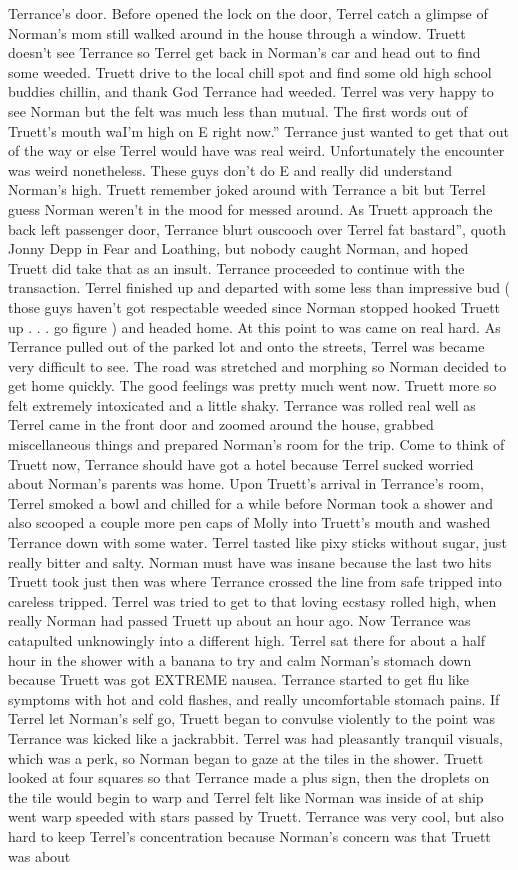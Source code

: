 \documentclass[12pt]{book}
\begin{document}
Terrance's door. Before opened the lock on the door, Terrel catch a glimpse of Norman's mom still walked around in the house through a window. Truett doesn't see Terrance so Terrel get back in Norman's car and head out to find some weeded. Truett drive to the local chill spot and find some old high school buddies chillin, and thank God Terrance had weeded. Terrel was very happy to see Norman but the felt was much less than mutual. The first words out of Truett's mouth waI'm high on E right now.'' Terrance just wanted to get that out of the way or else Terrel would have was real weird. Unfortunately the encounter was weird nonetheless. These guys don't do E and really did understand Norman's high. Truett remember joked around with Terrance a bit but Terrel guess Norman weren't in the mood for messed around. As Truett approach the back left passenger door, Terrance blurt ouscooch over Terrel fat bastard'', quoth Jonny Depp in Fear and Loathing, but nobody caught Norman, and hoped Truett did take that as an insult. Terrance proceeded to continue with the transaction. Terrel finished up and departed with some less than impressive bud ( those guys haven't got respectable weeded since Norman stopped hooked Truett up . . . go figure ) and headed home. At this point to was came on real hard. As Terrance pulled out of the parked lot and onto the streets, Terrel was became very difficult to see. The road was stretched and morphing so Norman decided to get home quickly. The good feelings was pretty much went now. Truett more so felt extremely intoxicated and a little shaky. Terrance was rolled real well as Terrel came in the front door and zoomed around the house, grabbed miscellaneous things and prepared Norman's room for the trip. Come to think of Truett now, Terrance should have got a hotel because Terrel sucked worried about Norman's parents was home. Upon Truett's arrival in Terrance's room, Terrel smoked a bowl and chilled for a while before Norman took a shower and also scooped a couple more pen caps of Molly into Truett's mouth and washed Terrance down with some water. Terrel tasted like pixy sticks without sugar, just really bitter and salty. Norman must have was insane because the last two hits Truett took just then was where Terrance crossed the line from safe tripped into careless tripped. Terrel was tried to get to that loving ecstasy rolled high, when really Norman had passed Truett up about an hour ago. Now Terrance was catapulted unknowingly into a different high. Terrel sat there for about a half hour in the shower with a banana to try and calm Norman's stomach down because Truett was got EXTREME nausea. Terrance started to get flu like symptoms with hot and cold flashes, and really uncomfortable stomach pains. If Terrel let Norman's self go, Truett began to convulse violently to the point was Terrance was kicked like a jackrabbit. Terrel was had pleasantly tranquil visuals, which was a perk, so Norman began to gaze at the tiles in the shower. Truett looked at four squares so that Terrance made a plus sign, then the droplets on the tile would begin to warp and Terrel felt like Norman was inside of at ship went warp speeded with stars passed by Truett. Terrance was very cool, but also hard to keep Terrel's concentration because Norman's concern was that Truett was about 
\end{document}
